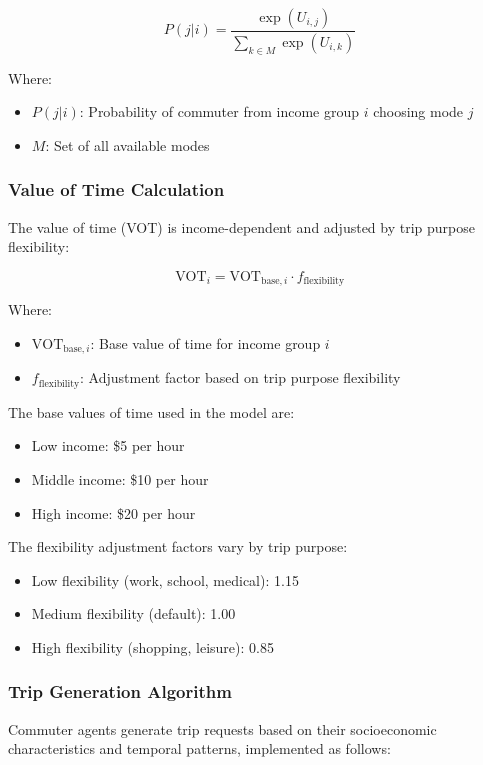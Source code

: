 \begin{equation}
P(j|i) = \frac{\exp(U_{i,j})}{\sum_{k \in M} \exp(U_{i,k})}
\end{equation}

Where:
\begin{itemize}
    \item $P(j|i)$: Probability of commuter from income group $i$ choosing mode $j$
    \item $M$: Set of all available modes
\end{itemize}

\subsubsection{Value of Time Calculation}
The value of time (VOT) is income-dependent and adjusted by trip purpose flexibility:

\begin{equation}
\text{VOT}_i = \text{VOT}_{\text{base},i} \cdot f_{\text{flexibility}}
\end{equation}

Where:
\begin{itemize}
    \item $\text{VOT}_{\text{base},i}$: Base value of time for income group $i$
    \item $f_{\text{flexibility}}$: Adjustment factor based on trip purpose flexibility
\end{itemize}

The base values of time used in the model are:
\begin{itemize}
    \item Low income: \$5 per hour 
    \item Middle income: \$10 per hour 
    \item High income: \$20 per hour 
\end{itemize}

The flexibility adjustment factors vary by trip purpose:
\begin{itemize}
    \item Low flexibility (work, school, medical): 1.15
    \item Medium flexibility (default): 1.00
    \item High flexibility (shopping, leisure): 0.85
\end{itemize}

\subsubsection{Trip Generation Algorithm}
Commuter agents generate trip requests based on their socioeconomic characteristics and temporal patterns, implemented as follows:

